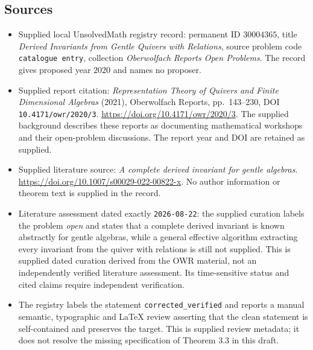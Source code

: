 \documentclass[11pt]{article}
\begin{document}
\subsection{Sources}
\begin{itemize}
\item Supplied local UnsolvedMath registry record: permanent ID \(30004365\), title \emph{Derived Invariants from Gentle Quivers with Relations}, source problem code \texttt{catalogue entry}, collection \emph{Oberwolfach Reports Open Problems}. The record gives proposed year \(2020\) and names no proposer.
\item Supplied report citation: \emph{Representation Theory of Quivers and Finite Dimensional Algebras} (2021), Oberwolfach Reports, pp.\ 143--230, DOI \texttt{10.4171/owr/2020/3}. \url{https://doi.org/10.4171/owr/2020/3}. The supplied background describes these reports as documenting mathematical workshops and their open-problem discussions. The report year and DOI are retained as supplied.
\item Supplied literature source: \emph{A complete derived invariant for gentle algebras}. \url{https://doi.org/10.1007/s00029-022-00822-x}. No author information or theorem text is supplied in the record.
\item Literature assessment dated exactly \texttt{2026-08-22}: the supplied curation labels the problem \emph{open} and states that a complete derived invariant is known abstractly for gentle algebras, while a general effective algorithm extracting every invariant from the quiver with relations is still not supplied. This is supplied dated curation derived from the OWR material, not an independently verified literature assessment. Its time-sensitive status and cited claims require independent verification.
\item The registry labels the statement \texttt{corrected\_verified} and reports a manual semantic, typographic and LaTeX review asserting that the clean statement is self-contained and preserves the target. This is supplied review metadata; it does not resolve the missing specification of Theorem 3.3 in this draft.
\end{itemize}
\end{document}
